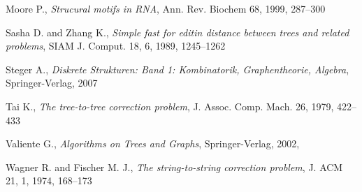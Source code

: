 \begin{thebibliography}{99}
  Moore P.,
  \textit{Strucural motifs in RNA},
  Ann. Rev. Biochem 68,
  1999,
  287--300
  
  Sasha D. and Zhang K.,
  \textit{Simple fast for editin distance between trees and related problems},
  SIAM J. Comput. 18, 6,
  1989,
  1245--1262
  
  Steger A.,
  \textit{Diskrete Strukturen: Band 1: Kombinatorik, Graphentheorie, Algebra},
  Springer-Verlag,
  2007
  
  Tai K.,
  \textit{The tree-to-tree correction problem},
  J. Assoc. Comp. Mach. 26,
  1979,
  422--433
  
  Valiente G.,
  \textit{Algorithms on Trees and Graphs},
  Springer-Verlag,
  2002,
  
  Wagner R. and Fischer M. J.,
  \textit{The string-to-string correction problem},
  J. ACM 21, 1,
  1974,
  168--173
  
\end{thebibliography}